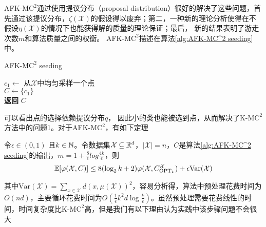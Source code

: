 AFK-M$\text{C}^2$通过使用提议分布（proposal distribution）很好的解决了这些问题，首先通过该提议分布，$\zeta(\mathcal{X})$的假设得以废弃；第二，一种新的理论分析使得在不假设$\eta(\mathcal{X})$的情况下也能获得解的质量的理论保证；最后， 新的结果表明了游走次数$m$和算法质量之间的权衡。 AFK-M$\text{C}^2$描述在算法\ref{alg:AFK-MC^2 seeding}中。
\begin{algorithm}
    \SetNoFillComment
    \caption{AFK-M$\text{C}^2$ seeding}\label{alg:AFK-MC^2 seeding}
    $c_1 \gets $ 从$\mathcal{X}$中均匀采样一个点 \\
    $C \gets \{c_1\}$ \\
    \textbf{返回} $C$
\end{algorithm}
可以看出点的选择依赖提议分布$q$， 因此小的类也能被选到点，从而解决了K-M$\text{C}^2$方法中的问题1。对于AFK-M$\text{C}^2$，有如下定理
\begin{theorem}
    \label{theo:AFKmc^2 performance}
    令$\epsilon \in (0,1)$ 且$k \in \mathbb{N}$。令数据集$\mathcal{X} \subseteq \mathbb{R}^d$，$|\mathcal{X}| = n$，$C$是算法\ref{alg:AFK-MC^2 seeding}的输出，$m = 1+\frac{8}{\epsilon}log \frac{4k}{\epsilon}$，则
    \begin{equation*}
    \mathbb{E}[\varphi(\mathcal{X},C)]\leq 8(\log_{2}k+2)\varphi(\mathcal{X},C_{\text{OPT}_k}^{\mathcal{X}}) + \epsilon\text{Var}(\mathcal{X})
    \end{equation*}
\end{theorem}
其中$\text{Var}(\mathcal{X})=\sum_{x \in  \mathcal{X}}d(x,\mu(\mathcal{X}))^2$，容易分析得，算法中预处理花费时间为$O(nd)$，主要循环花费时间为$O(\frac{1}{\epsilon}k^2 d\log \frac{k}{\epsilon})$。虽然预处理需要花费线性的时间，时间复杂度比K-M$\text{C}^2$高，但是我们有以下理由认为实践中该步骤问题不会很大
